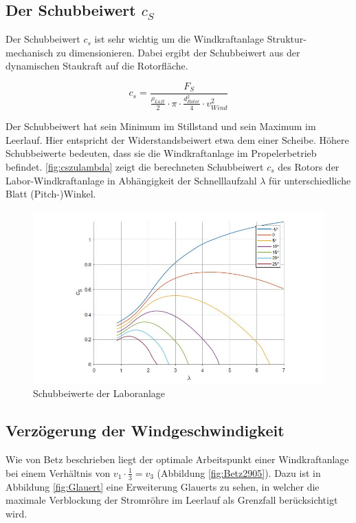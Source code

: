 \subsection{Der Schubbeiwert \texorpdfstring{$c_S$}{}}

Der Schubbeiwert $c_{s}$ ist sehr wichtig um die Windkraftanlage Struktur-mechanisch zu dimensionieren.  Dabei ergibt der Schubbeiwert aus der dynamischen Staukraft auf die Rotorfläche.

\begin{equation}
  c_{s}= \frac{F_{S}}{\frac{\rho_{Luft}}{2}\cdot \pi \cdot \frac{d^2_{Rotor}}{4} \cdot v^2_{Wind}}
    \label{eq:Schubbeiwert_cs}
\end{equation}

Der Schubbeiwert hat sein Minimum im Stillstand und sein Maximum im Leerlauf. Hier entspricht der Widerstandsbeiwert etwa dem einer Scheibe. Höhere Schubbeiwerte bedeuten, dass sie die Windkraftanlage im Propelerbetrieb befindet.\cite{Anleitung}
\autoref{fig:cszulambda} zeigt die berechneten Schubbeiwert $c_{s}$ des Rotors der Labor-Windkraftanlage in Abhängigkeit der Schnelllaufzahl $\lambda$ für unterschiedliche Blatt (Pitch-)Winkel.
\begin{figure}[H]
    \centering
    \includegraphics[width=1\textwidth]{Abbildungen/cszulambda.jpg}
    \caption{Schubbeiwerte der Laboranlage\cite{Anleitung}}
    \label{fig:cszulambda}
  \end{figure}

\newpage
\subsection{Verzögerung der Windgeschwindigkeit}
Wie von Betz beschrieben liegt der optimale Arbeitspunkt einer Windkraftanlage bei einem Verhältnis von $v_{1} \cdot \frac{1}{3}=v_{3}$  (Abbildung \ref{fig:Betz2905}). Dazu ist in Abbildung \ref{fig:Glauert} eine Erweiterung Glauerts zu sehen, in welcher die maximale Verblockung der Stromröhre im Leerlauf als Grenzfall berücksichtigt wird.\cite{Anleitung}

